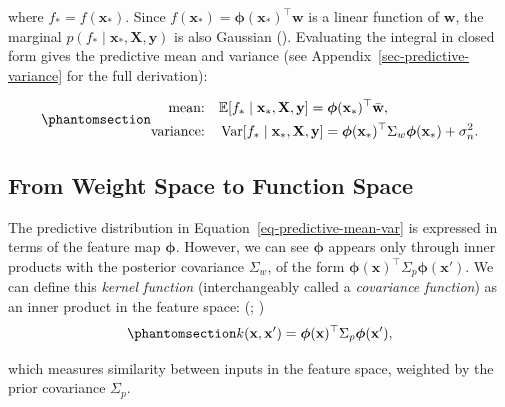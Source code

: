 \documentclass[
  letterpaper,
  DIV=11,
  numbers=noendperiod]{scrartcl}
\begin{document}
where \(f_* = f(\mathbf{x}_*)\). Since
\(f(\mathbf{x}_*) = \boldsymbol{\phi}(\mathbf{x}_*)^\top \mathbf{w}\) is
a linear function of \(\mathbf{w}\), the marginal
\(p(f_* \mid \mathbf{x}_*, \mathbf{X}, \mathbf{y})\) is also Gaussian
(). Evaluating
the integral in closed form gives the predictive mean and variance (see
Appendix~\ref{sec-predictive-variance} for the full derivation):

\begin{equation}\phantomsection\label{eq-predictive-mean-var}{
\begin{aligned}
\text{mean:} \quad & \mathbb{E}[f_* \mid \mathbf{x}_*, \mathbf{X}, \mathbf{y}] = \boldsymbol{\phi}(\mathbf{x}_*)^\top \bar{\mathbf{w}}, \\
\text{variance:} \quad & \operatorname{Var}[f_* \mid \mathbf{x}_*, \mathbf{X}, \mathbf{y}] = \boldsymbol{\phi}(\mathbf{x}_*)^\top \Sigma_w \boldsymbol{\phi}(\mathbf{x}_*) + \sigma_n^2.
\end{aligned}
}\end{equation}

\subsection{From Weight Space to Function
Space}\label{sec-weight-to-function-space}

The predictive distribution in Equation~\ref{eq-predictive-mean-var} is
expressed in terms of the feature map \(\boldsymbol{\phi}\). However, we
can see \(\boldsymbol{\phi}\) appears only through inner products with
the posterior covariance \(\Sigma_w\), of the form
\(\boldsymbol{\phi}(\mathbf{x})^\top \Sigma_p \boldsymbol{\phi}(\mathbf{x}')\).
We can define this \emph{kernel function} (interchangeably called a
\emph{covariance function}) as an inner product in the feature space:
(;
)
\begin{equation}\phantomsection\label{eq-kernel-def}{
k(\mathbf{x}, \mathbf{x}') = \boldsymbol{\phi}(\mathbf{x})^\top \Sigma_p \boldsymbol{\phi}(\mathbf{x}'),
}\end{equation}

which measures similarity between inputs in the feature space, weighted
by the prior covariance \(\Sigma_p\).
\end{document}
